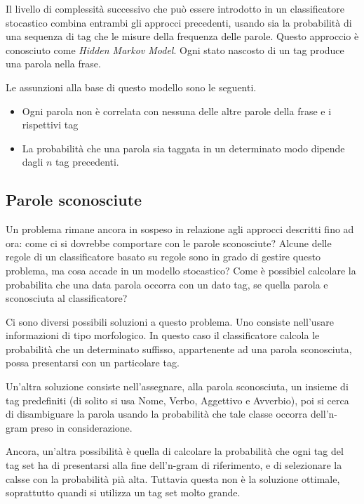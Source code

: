 Il livello di complessit\`a successivo che pu\`o essere introdotto in un
classificatore stocastico combina entrambi gli approcci precedenti, usando sia
la probabilit\`a di una sequenza di tag che le misure della frequenza delle parole.
Questo approccio \`e conosciuto come \emph{Hidden Markov Model}.
Ogni stato nascosto di un tag produce una parola nella frase.

Le assunzioni alla base di questo modello sono le seguenti.

\begin{itemize}
  \item Ogni parola non \`e correlata con nessuna delle altre parole della frase
        e i rispettivi tag
  \item La probabilit\`a che una parola sia taggata in un determinato modo dipende
        dagli $n$ tag precedenti.
\end{itemize}

\subsection{Parole sconosciute}

Un problema rimane ancora in sospeso in relazione agli approcci descritti fino
ad ora: come ci si dovrebbe comportare con le parole sconosciute? Alcune delle
regole di un classificatore basato su regole sono in grado di gestire questo
problema, ma cosa accade in un modello stocastico? Come \`e possibiel calcolare
la probabilita che una data parola occorra con un dato tag, se quella parola e
sconosciuta al classificatore?

Ci sono diversi possibili soluzioni a questo problema.
Uno consiste nell'usare informazioni di tipo morfologico.
In questo caso il classificatore calcola le probabilit\`a che un determinato
suffisso, appartenente ad una parola sconosciuta, possa presentarsi con un
particolare tag.

Un'altra soluzione consiste nell'assegnare, alla parola sconosciuta, un insieme
di tag predefiniti (di solito si usa Nome, Verbo, Aggettivo e Avverbio), poi si
cerca di disambiguare la parola usando la probabilit\`a che tale classe occorra
dell'n-gram preso in considerazione.

Ancora, un'altra possibilit\`a \`e quella di calcolare la probabilit\`a che ogni
tag del tag set ha di presentarsi alla fine dell'n-gram di riferimento, e di
selezionare la calsse con la probabilit\`a pi\`a alta. Tuttavia questa non \`e
la soluzione ottimale, soprattutto quandi si utilizza un tag set molto grande.

